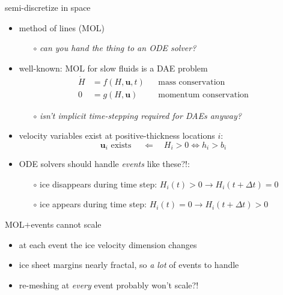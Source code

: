 \documentclass[hide notes,intlimits,usenames,dvipsnames]{beamer}
\begin{document}
\begin{frame}{semi-discretize in space}

\begin{itemize}
\item method of lines (MOL)
    \begin{itemize}
    \item[$\circ$] \emph{can you hand the thing to an ODE solver?}
    \end{itemize}
\item well-known: MOL for slow fluids is a DAE problem
\begin{align*}
\dot H &= f(H,\mathbf{u},t) && \text{mass conservation} \\
     0 &= g(H,\mathbf{u})   && \text{momentum conservation}
\end{align*}
\vspace{-5mm}
    \begin{itemize}
    \item[$\circ$] \emph{isn't implicit time-stepping required for DAEs anyway?}
    \end{itemize}
\item velocity variables exist at positive-thickness locations $i$:
    $$\mathbf{u}_i \text{ exists } \quad \Longleftarrow \quad H_i > 0 \iff h_i > b_i$$
\item ODE solvers should handle \emph{events} like these?!:
    \begin{itemize}
    \item[$\circ$] ice disappears during time step:  $H_i(t)>0 \to H_i(t+\Delta t)=0$
    \item[$\circ$] ice appears during time step:  $H_i(t)=0 \to H_i(t+\Delta t)>0$
    \end{itemize}
\end{itemize}
\end{frame}


\begin{frame}{MOL$+$events cannot scale}

\begin{center}

\end{center}

\vspace{-6mm}
\begin{itemize}
\item at each event the ice velocity dimension changes
\item ice sheet margins nearly fractal, so \emph{a lot} of events to handle
\item re-meshing at \emph{every} event probably won't scale?!
\end{itemize}
\end{frame}
\end{document}
